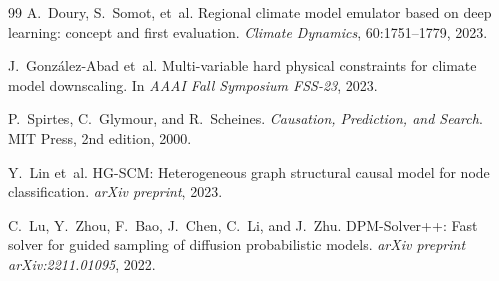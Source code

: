 \begin{thebibliography}{99}
 A.~Doury, S.~Somot, et~al. Regional climate model emulator based on deep learning: concept and first evaluation. \emph{Climate Dynamics}, 60:1751--1779, 2023.

 J.~González-Abad et~al. Multi-variable hard physical constraints for climate model downscaling. In \emph{AAAI Fall Symposium FSS-23}, 2023.

 P.~Spirtes, C.~Glymour, and R.~Scheines. \emph{Causation, Prediction, and Search}. MIT Press, 2nd edition, 2000.

 Y.~Lin et~al. HG-SCM: Heterogeneous graph structural causal model for node classification. \emph{arXiv preprint}, 2023.

 C.~Lu, Y.~Zhou, F.~Bao, J.~Chen, C.~Li, and J.~Zhu. DPM-Solver++: Fast solver for guided sampling of diffusion probabilistic models. \emph{arXiv preprint arXiv:2211.01095}, 2022.

\end{thebibliography}